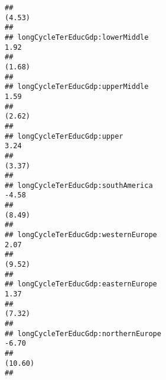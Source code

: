 \documentclass[
]{article}
\begin{document}
\begin{verbatim}
##                                                                                   (4.53)                        
##                                                                                                                 
## longCycleTerEducGdp:lowerMiddle                                                    1.92                         
##                                                                                   (1.68)                        
##                                                                                                                 
## longCycleTerEducGdp:upperMiddle                                                    1.59                         
##                                                                                   (2.62)                        
##                                                                                                                 
## longCycleTerEducGdp:upper                                                          3.24                         
##                                                                                   (3.37)                        
##                                                                                                                 
## longCycleTerEducGdp:southAmerica                                                                   -4.58        
##                                                                                                    (8.49)       
##                                                                                                                 
## longCycleTerEducGdp:westernEurope                                                                   2.07        
##                                                                                                    (9.52)       
##                                                                                                                 
## longCycleTerEducGdp:easternEurope                                                                   1.37        
##                                                                                                    (7.32)       
##                                                                                                                 
## longCycleTerEducGdp:northernEurope                                                                 -6.70        
##                                                                                                   (10.60)       
##                                                                                                                 

\end{verbatim}
\end{document}

